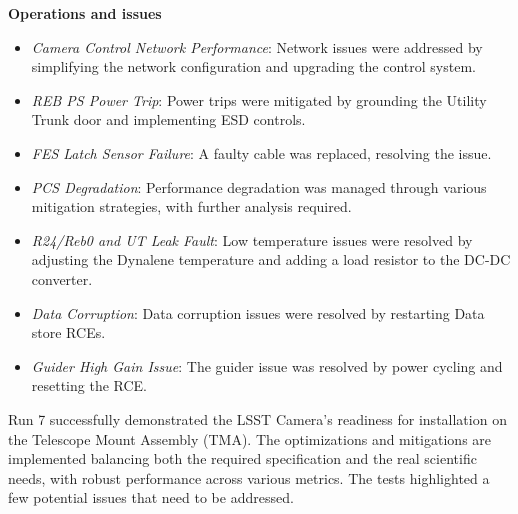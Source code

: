 \textbf{Operations and issues} \\
\begin{itemize}
    \item \textit{Camera Control Network Performance}: Network issues were addressed by simplifying the network configuration and upgrading the control system.
    \item \textit{REB PS Power Trip}: Power trips were mitigated by grounding the Utility Trunk door and implementing ESD controls.
    \item \textit{FES Latch Sensor Failure}: A faulty cable was replaced, resolving the issue.
    \item \textit{PCS Degradation}: Performance degradation was managed through various mitigation strategies, with further analysis required.
    \item \textit{R24/Reb0 and UT Leak Fault}: Low temperature issues were resolved by adjusting the Dynalene temperature and adding a load resistor to the DC-DC converter.
    \item \textit{Data Corruption}: Data corruption issues were resolved by restarting Data store RCEs.
    \item \textit{Guider High Gain Issue}: The guider issue was resolved by power cycling and resetting the RCE.
\end{itemize}

Run 7 successfully demonstrated the LSST Camera's readiness for installation on the Telescope Mount Assembly (TMA). The optimizations and mitigations are implemented balancing both the required specification and the real scientific needs, with robust performance across various metrics. The tests highlighted a few potential issues that need to be addressed. 

\clearpage